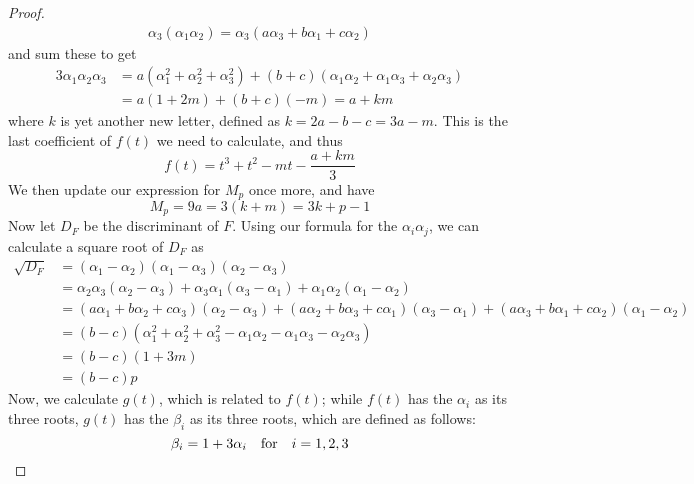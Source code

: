 \begin{proof}
\begin{align*}
	\alpha_3 (\alpha_1 \alpha_2) = \alpha_3 (a\alpha_3 + b\alpha_1 + c\alpha_2)
\end{align*}
and sum these to get
\begin{align*}
	3\alpha_1 \alpha_2 \alpha_3 &= a(\alpha_1^2 + \alpha_2^2 + \alpha_3^2) + (b+c)(\alpha_1\alpha_2 +\alpha_1\alpha_3 +\alpha_2\alpha_3)\\
	&= a(1+2m) +(b+c)(-m) = a + km
\end{align*}
where $k$ is yet another new letter, defined as $k = 2a-b-c=3a-m$. This is the last coefficient of $f(t)$ we need to calculate, and thus
$$f(t) = t^3 + t^2 - mt - \frac{a+km}{3}$$
We then update our expression for $M_p$ once more, and have
$$M_p = 9a = 3(k + m) = 3k + p - 1$$
Now let $D_F$ be the discriminant of $F$. Using our formula for the $\alpha_i \alpha_j$, we can calculate a square root of $D_F$ as
\begin{align*}
	\sqrt{D_F} &= (\alpha_1 - \alpha_2)(\alpha_1 - \alpha_3)(\alpha_2 - \alpha_3)\\
	&= \alpha_2\alpha_3(\alpha_2-\alpha_3) + \alpha_3\alpha_1(\alpha_3-\alpha_1) + \alpha_1\alpha_2(\alpha_1-\alpha_2)\\
	&= (a\alpha_1 + b\alpha_2 + c\alpha_3)(\alpha_2 - \alpha_3) + (a\alpha_2 + b\alpha_3 + c\alpha_1)(\alpha_3 - \alpha_1) + (a\alpha_3 + b\alpha_1 + c\alpha_2)(\alpha_1 - \alpha_2)\\
	&= (b-c)(\alpha_1^2 + \alpha_2^2 + \alpha_3^2 - \alpha_1\alpha_2 - \alpha_1\alpha_3 - \alpha_2\alpha_3)\\
	&= (b-c)(1 + 3m)\\
	&= (b-c)p
\end{align*}
Now, we calculate $g(t)$, which is related to $f(t)$; while $f(t)$ has the $\alpha_i$ as its three roots, $g(t)$ has the $\beta_i$ as its three roots, which are defined as follows:
$$\beta_i = 1 + 3\alpha_i\quad \text{for}\quad i=1,2,3$$
\end{proof}
